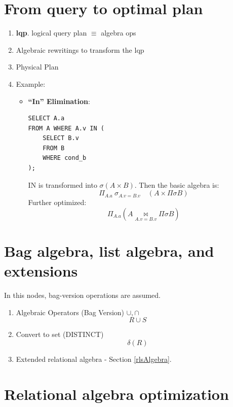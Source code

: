 \documentclass[a4paper]{report}
\begin{document}
\section{From query to optimal plan}
\begin{enumerate}
\item \textbf{lqp}. logical query plan $\equiv$ algebra ops 
\item Algebraic rewritings to transform the lqp
\item Physical Plan
\item Example:
\begin{itemize}
\item \textbf{``In'' Elimination}: 
\begin{lstlisting}
SELECT A.a
FROM A WHERE A.v IN (
    SELECT B.v
    FROM B
    WHERE cond_b
);
\end{lstlisting}
IN is transformed into $\sigma (A\times B)$. Then the basic algebra is:
$$
\Pi_{A.a}\ \sigma_{A.v=B.v}\quad (A \times \Pi \sigma B)
$$
Further optimized:
$$
\Pi_{A.a}(A \underset{A.v=B.v}\bowtie \Pi \sigma B)
$$

\end{itemize}
\end{enumerate}
\section{Bag algebra, list algebra, and extensions}
In this nodes, bag-version operations are assumed. 
\begin{enumerate}
\item Algebraic Operators (Bag Version) $\cup, \cap$
$$
R\cup S
$$
\item Convert to set (DISTINCT)
$$
\delta(R)
$$
\item Extended relational algebra - Section \ref{rlsAlgebra}.
\end{enumerate}
\section{Relational algebra optimization}
\end{document}
